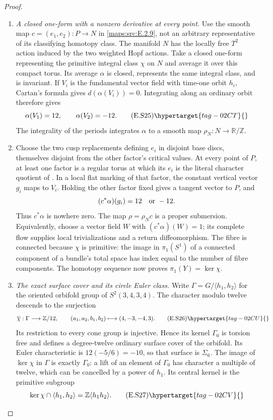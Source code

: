 \begin{proof}
\begin{enumerate}[label={$\langle1\rangle$\arabic*.},leftmargin=*]
\item \emph{A closed one-form with a nonzero derivative at every point.}
Use the smooth map $c=(e_1,e_2):P\to N$ in \ref{maps:src:E.2.9},
not an arbitrary representative of its classifying homotopy
class. The manifold $N$ has the locally free $T^2$ action
induced by the two weighted Hopf actions. Take a closed
one-form representing the primitive integral class $\chi$
on $N$ and average it over this compact torus. Its average
$\alpha$ is closed, represents the same integral class,
and is invariant. If $V_i$ is the fundamental vector field
with time-one orbit $h_i$, Cartan's formula gives
$d(\alpha(V_i))=0$. Integrating along an ordinary orbit
therefore gives
\[
                  \alpha(V_1)=12,\qquad \alpha(V_2)=-12.
 \tag{E.S25}\hypertarget{tag-02CT}{}\label{maps:eq:E.S25}
\]
The integrality of the periods integrates $\alpha$ to a
smooth map $\rho_N:N\to\mathbb R/\mathbb Z$.

\item Choose the two cusp replacements defining $e_i$ in disjoint
base discs, themselves disjoint from the other factor's
critical values. At every point of $P$, at least one factor
is a regular torus at which its $e_i$ is the literal character
quotient of . In a local flat marking of that factor,
the constant vertical vector $g_i$ maps to $V_i$. Holding
the other factor fixed gives a tangent vector to $P$, and
\[
                     (c^*\alpha)(g_i)=12\quad\hbox{or }-12.
\]
Thus $c^*\alpha$ is nowhere zero.  The map $\rho=\rho_Nc$ is a
proper submersion. Equivalently, choose a vector field $W$
with $(c^*\alpha)(W)=1$; its complete flow supplies local
trivializations and a return diffeomorphism. The fibre is
connected because $\chi$ is primitive: the image in
$\pi_1(S^1)$ of a connected component of a bundle's total
space has index equal to the number of fibre components.
The homotopy sequence now proves $\pi_1(Y)=\ker\chi$.

\item \emph{The exact surface cover and its circle Euler class.}
Write $\Gamma=G/\langle h_1,h_2\rangle$ for the oriented
orbifold group of $S^2(3,4,3,4)$. The character modulo
twelve descends to the surjection
\[
 \overline\chi:\Gamma\longrightarrow\mathbb Z/12,
       \qquad(a_1,a_2,b_1,b_2)\longmapsto(4,-3,-4,3).
 \tag{E.S26}\hypertarget{tag-02CU}{}\label{maps:eq:E.S26}
\]
Its restriction to every cone group is injective. Hence its
kernel $\Gamma_0$ is torsion free and defines a degree-twelve
ordinary surface cover of the orbifold. Its Euler characteristic
is $12(-5/6)=-10$, so that surface is $\Sigma_6$. The image
of $\ker\chi$ in $\Gamma$ is exactly $\Gamma_0$: a lift of
an element of $\Gamma_0$ has character a multiple of twelve,
which can be cancelled by a power of $h_1$. Its central
kernel is the primitive subgroup
\[
 \ker\chi\cap\langle h_1,h_2\rangle
                =\mathbb Z\langle h_1h_2\rangle.
 \tag{E.S27}\hypertarget{tag-02CV}{}\label{maps:eq:E.S27}
\]


\end{enumerate}
\end{proof}
